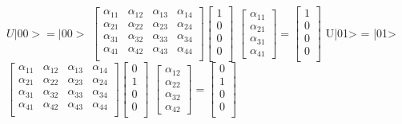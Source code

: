 \documentclass{article}
\begin{document}
$U|00> = |00>$ \Rightarrow $\begin{bmatrix}
    \alpha_{11} & \alpha_{12} & \alpha_{13} &\alpha_{14}\\
    \alpha_{21} & \alpha_{22} & \alpha_{23} &\alpha_{24}\\
    \alpha_{31} & \alpha_{32} & \alpha_{33} &\alpha_{34}\\
    \alpha_{41} & \alpha_{42} & \alpha_{43} &\alpha_{44}\\
\end{bmatrix}\begin{bmatrix}
    1\\
    0\\
    0\\
    0\\
\end{bmatrix}$ \Rightarrow $\begin{bmatrix}
    \alpha_{11}\\
    \alpha_{21}\\
    \alpha_{31}\\
    \alpha_{41}
\end{bmatrix} = \begin{bmatrix}
    1\\
    0\\
    0\\
    0\\
\end{bmatrix}$
\vspace{0.2cm}\newline
U|01> = |01>  \Rightarrow $\begin{bmatrix}
    \alpha_{11} & \alpha_{12} & \alpha_{13} &\alpha_{14}\\
    \alpha_{21} & \alpha_{22} & \alpha_{23} &\alpha_{24}\\
    \alpha_{31} & \alpha_{32} & \alpha_{33} &\alpha_{34}\\
    \alpha_{41} & \alpha_{42} & \alpha_{43} &\alpha_{44}\\
\end{bmatrix}\begin{bmatrix}
    0\\
    1\\
    0\\
    0\\
\end{bmatrix}$ \Rightarrow $\begin{bmatrix}
    \alpha_{12}\\
    \alpha_{22}\\
    \alpha_{32}\\
    \alpha_{42}
\end{bmatrix} = \begin{bmatrix}
    0\\
    1\\
    0\\
    0\\
\end{bmatrix}$
\end{document}
